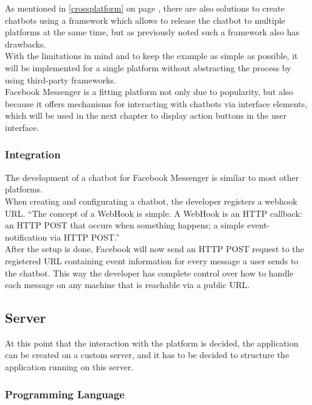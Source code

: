 As mentioned in \ref{crossplatform} on page \pageref{crossplatform}, there are also solutions to create chatbots using a framework which allows to release the chatbot to multiple platforms at the same time, but as previously noted such a framework also has drawbacks.
\\
With the limitations in mind and to keep the example as simple as possible,
it will be implemented for a single platform without abstracting the process by using third-party frameworks.
\\

Facebook Messenger is a fitting platform not only due to popularity,
but also because it offers mechanisms for interacting with chatbots via interface elements,
which will be used in the next chapter to display action buttons in the user interface.
\\


\subsubsection{Integration}

The development of a chatbot for Facebook Messenger is similar to most other platforms.
\\
When creating and configurating a chatbot, the developer registers a webhook URL.
``The concept of a WebHook is simple. A WebHook is an HTTP callback: an HTTP POST that occurs when something happens; a simple event-notification via HTTP POST.''\cite{webhook}
\\
After the setup is done,
Facebook will now send an HTTP POST request to the registered URL containing event information for every message a user sends to the chatbot.
This way the developer has complete control over how to handle each message on any machine that is reachable via a public URL.


\subsection{Server}

At this point that the interaction with the platform is decided, the application can be created on a custom server,
and it has to be decided to structure the application running on this server.


\subsubsection{Programming Language}

